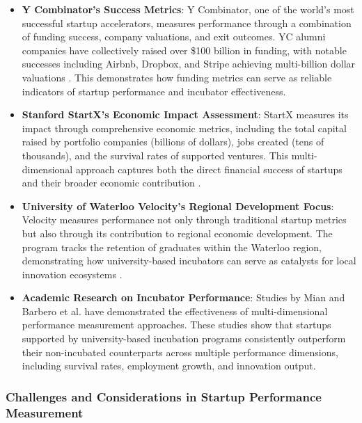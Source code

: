 \documentclass[../Main.tex]{subfiles}
\begin{document}
\begin{itemize}
    \item \textbf{Y Combinator's Success Metrics}: Y Combinator, one of the world's most successful startup accelerators, measures performance through a combination of funding success, company valuations, and exit outcomes. YC alumni companies have collectively raised over \$100 billion in funding, with notable successes including Airbnb, Dropbox, and Stripe achieving multi-billion dollar valuations \cite{YCombinator2024}. This demonstrates how funding metrics can serve as reliable indicators of startup performance and incubator effectiveness.
    
    \item \textbf{Stanford StartX's Economic Impact Assessment}: StartX measures its impact through comprehensive economic metrics, including the total capital raised by portfolio companies (billions of dollars), jobs created (tens of thousands), and the survival rates of supported ventures. This multi-dimensional approach captures both the direct financial success of startups and their broader economic contribution \cite{StartX2024}.
    
    \item \textbf{University of Waterloo Velocity's Regional Development Focus}: Velocity measures performance not only through traditional startup metrics but also through its contribution to regional economic development. The program tracks the retention of graduates within the Waterloo region, demonstrating how university-based incubators can serve as catalysts for local innovation ecosystems \cite{UWaterlooVelocity2024}.
    
    \item \textbf{Academic Research on Incubator Performance}: Studies by Mian \cite{mian1996assessing} and Barbero et al. \cite{barbero2012revisiting} have demonstrated the effectiveness of multi-dimensional performance measurement approaches. These studies show that startups supported by university-based incubation programs consistently outperform their non-incubated counterparts across multiple performance dimensions, including survival rates, employment growth, and innovation output.
\end{itemize}

\subsubsection*{Challenges and Considerations in Startup Performance Measurement}
\end{document}
